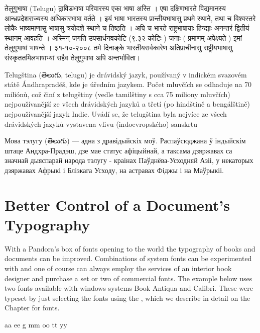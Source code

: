 \bgroup
\telugufam

तेलुगुभाषा (Telugu) द्राविडभाषा परिवारस्‍य एका भाषा अस्ति । एषा दक्षिणभारते विद्यमानस्य आन्ध्रप्रदेशराज्यस्य अधिकारभाषा वर्तते । इयं भाषा भारतस्य प्रान्तीयभाषासु प्रथमे स्थाने, तथा च विश्वस्तरे लोकैः भाष्यमाणासु भाषासु त्रयोदशे स्थाने च तिष्ठति । अपि च भारते राष्ट्रभाषायाः हिन्द्याः अनन्तरं द्वितीयं स्थानम् आवहति । अस्मिन् जगति उपसार्धनवकोटि (९.३२ कोटिः ) जनाः ( प्रमाणम् अपेक्ष्यते ) इमां तेलुगुभाषां भाषन्ते । ३१-१०-२००८ तमे दिनाङ्के भारतीयसर्वकारेण अतिप्राचीनासु राष्ट्रीयभाषासु संस्कृततमिलभाषाभ्यां सहैव तेलुगुभाषा अपि अन्तर्भाविता।
\egroup

Telugština (తెలుగు, telugu) je drávidský jazyk, používaný v indickém svazovém státě Ándhrapradéš, kde je úředním jazykem. Počet mluvčích se odhaduje na 70 miliónů, což činí z telugštiny (vedle tamilštiny s cca 75 miliony mluvčích) nejpoužívanější ze všech drávidských jazyků a třetí (po hindštině a bengálštině) nejpoužívanější jazyk Indie. Uvádí se, že telugština byla nejvíce ze všech drávidských jazyků vystavena vlivu (indoevropského) sanskrtu

Мова тэлугу (తెలుగు) — адна з дравідыйскіх моў. Распаўсюджана ў індыйскім штаце Андхра-Прадэш, дзе мае статус афіцыйнай, а таксама дзяржавах са значнай дыяспарай народа тэлугу - краінах Паўднёва-Усходняй Азіі, у некаторых дзяржавах Афрыкі і Блізкага Усходу, на астравах Фіджы і на Маўрыкіі.





\section{Better Control of a Document's Typography}

With a Pandora's box of fonts opening to the \latex world the typography of books and documents can be improved. Combinations of system fonts can be experimented with and one of course can always employ the services of an interior book designer and purchase a set or two of commercial fonts. The example below uses two fonts available with windows systems Book Antiqua and Calibri. These were typeset by just selecting the fonts using the \cmd{\fontspec}, which we describe in detail on the Chapter for fonts.
\bigskip

\newfontfamily{}
\newfontfamily{}

\centerline{
\color{gray}\huge{\antiqua a}a {\antiqua e}\calibri e \calibri g \antiqua m\calibri m 
\antiqua o{\calibri o} {\antiqua t}{\calibri t} {\antiqua y}{\calibri y}
}
 

